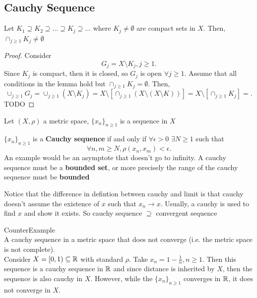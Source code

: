 \documentclass[a4paper]{article}
\begin{document}
\subsection{Cauchy Sequence}
\begin{lemma}
  Let $K_1 \supseteq K_2 \supseteq \ldots \supseteq K_j \supseteq \ldots$ where $K_j \neq \emptyset$ are compact sets in $X$. Then,  $\cap_{j \geq 1} K_j \neq \emptyset$
  \begin{proof}
    Consider 
    \[
    G_j = X \setminus K_j, j \geq 1
    .\]
    Since $K_j$ is compact, then it is closed, so  $G_j$ is open $\forall j \geq 1$.  Assume that all conditions in the lemma hold but $\cap_{j \geq 1} K_j = \emptyset$. Then, 
    \[
      \cup_{j \geq 1} G_j = \cup_{j \geq 1} \left( X \setminus K_j \right) =X \setminus [\cap_{j \geq 1} \left( X \setminus (X \setminus K) \right)]= X \setminus [\cap_{j \geq 1} K_j] =   
    .\] 
    TODO

  \end{proof}
\end{lemma} 
Let $\left( X, \rho \right) $ a metric space, $\{x_n\}_{n \geq 1} $ is a sequence in $X$

\begin{definition}
  $\{x_n\}_{n \geq 1} $ is a \textbf{Cauchy sequence} if and only if  $\forall \epsilon > 0$ $\exists N \geq 1$ such that 
  \[
    \forall n,m \geq N, \rho(x_n,x_m) < \epsilon
  .\] 
  An example would be an asymptote that doesn't go to infinity. A cauchy sequence must be a \textbf{bounded set}, or more precisely the range of the cauchy sequence must be \textbf{bounded} 
\end{definition}

\begin{note}
  Notice that the difference in defintion between cauchy and limit is that cauchy doesn't assume the existence of $x$ such that  $x_n \to x$. Usually, a cauchy is used to find $x$ and show it exists. So cauchy sequence  $\supseteq$ convergent sequence 
\end{note}

\begin{note}{CounterExample}\\
  A cauchy sequence in a metric space that does not converge (i.e. the metric space is not complete).\\


  Consider $X = [0,1) \subseteq \mathbb{R}$ with standard $\rho$. Take  $x_n = 1 - \frac{1}{n}, n \geq 1$. Then this sequence is a cauchy sequence in $\mathbb{R}$ and since distance is inherited by $X$, then  the sequence is also cauchy in  $X$. However, while the $\{x_n\}_{n \geq 1} $ converges in  $\mathbb{R}$, it does not converge in $X$.   
\end{note}
\end{document}

